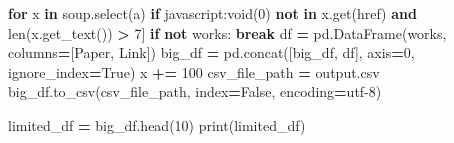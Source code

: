 \documentclass[
  12pt,
]{article}
\newenvironment{Shaded}{\begin{snugshade}}{\end{snugshade}}
\newcommand{\BuiltInTok}[1]{#1}
\newcommand{\ControlFlowTok}[1]{\textcolor[rgb]{0.13,0.29,0.53}{\textbf{#1}}}
\newcommand{\DecValTok}[1]{\textcolor[rgb]{0.00,0.00,0.81}{#1}}
\newcommand{\KeywordTok}[1]{\textcolor[rgb]{0.13,0.29,0.53}{\textbf{#1}}}
\newcommand{\NormalTok}[1]{#1}
\newcommand{\OperatorTok}[1]{\textcolor[rgb]{0.81,0.36,0.00}{\textbf{#1}}}
\newcommand{\StringTok}[1]{\textcolor[rgb]{0.31,0.60,0.02}{#1}}
\newcommand{\VariableTok}[1]{\textcolor[rgb]{0.00,0.00,0.00}{#1}}
\begin{document}
\begin{Shaded}
\begin{Highlighting}[]
             \ControlFlowTok{for}\NormalTok{ x }\KeywordTok{in}\NormalTok{ soup.select(}\StringTok{\textquotesingle{}a\textquotesingle{}}\NormalTok{) }\ControlFlowTok{if} \StringTok{\textquotesingle{}javascript:void(0)\textquotesingle{}} \KeywordTok{not} \KeywordTok{in}\NormalTok{ x.get(}\StringTok{\textquotesingle{}href\textquotesingle{}}\NormalTok{)}
             \KeywordTok{and} \BuiltInTok{len}\NormalTok{(x.get\_text()) }\OperatorTok{\textgreater{}} \DecValTok{7}\NormalTok{]}
    \ControlFlowTok{if} \KeywordTok{not}\NormalTok{ works:  }
        \ControlFlowTok{break}
\NormalTok{    df }\OperatorTok{=}\NormalTok{ pd.DataFrame(works, columns}\OperatorTok{=}\NormalTok{[}\StringTok{\textquotesingle{}Paper\textquotesingle{}}\NormalTok{, }\StringTok{\textquotesingle{}Link\textquotesingle{}}\NormalTok{])}
\NormalTok{    big\_df }\OperatorTok{=}\NormalTok{ pd.concat([big\_df, df], axis}\OperatorTok{=}\DecValTok{0}\NormalTok{, ignore\_index}\OperatorTok{=}\VariableTok{True}\NormalTok{)}
\NormalTok{    x }\OperatorTok{+=} \DecValTok{100}  
\NormalTok{csv\_file\_path }\OperatorTok{=} \StringTok{\textquotesingle{}output.csv\textquotesingle{}}
\NormalTok{big\_df.to\_csv(csv\_file\_path, index}\OperatorTok{=}\VariableTok{False}\NormalTok{, encoding}\OperatorTok{=}\StringTok{\textquotesingle{}utf{-}8\textquotesingle{}}\NormalTok{)}

\NormalTok{limited\_df }\OperatorTok{=}\NormalTok{ big\_df.head(}\DecValTok{10}\NormalTok{)}
\BuiltInTok{print}\NormalTok{(limited\_df)}
\end{Highlighting}
\end{Shaded}
\end{document}
